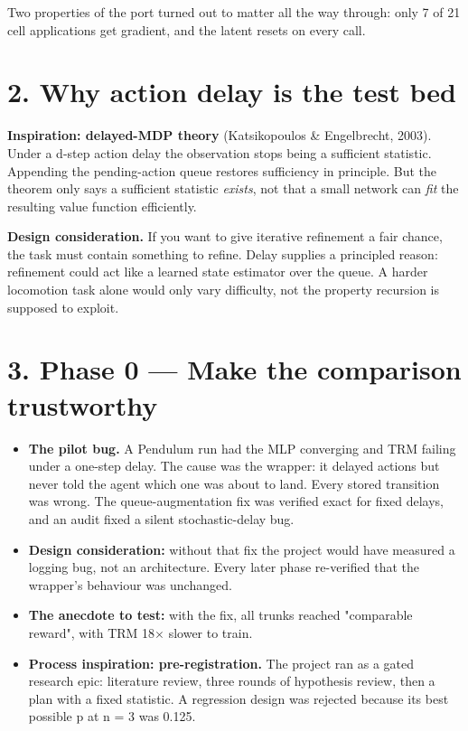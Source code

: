 \documentclass[11pt]{article}
\begin{document}
Two properties of the port turned out to matter all the way through: only 7 of 21 cell applications get gradient, and the latent resets on every call.



\section*{2. Why action delay is the test bed}



\textbf{Inspiration: delayed-MDP theory} (Katsikopoulos \& Engelbrecht, 2003). Under a d-step action delay the observation stops being a sufficient statistic. Appending the pending-action queue restores sufficiency in principle. But the theorem only says a sufficient statistic \emph{exists}, not that a small network can \emph{fit} the resulting value function efficiently.



\textbf{Design consideration.} If you want to give iterative refinement a fair chance, the task must contain something to refine. Delay supplies a principled reason: refinement could act like a learned state estimator over the queue. A harder locomotion task alone would only vary difficulty, not the property recursion is supposed to exploit.



\section*{3. Phase 0 --- Make the comparison trustworthy}



\begin{itemize}
\item \textbf{The pilot bug.} A Pendulum run had the MLP converging and TRM failing under a one-step delay. The cause was the wrapper: it delayed actions but never told the agent which one was about to land. Every stored transition was wrong. The queue-augmentation fix was verified exact for fixed delays, and an audit fixed a silent stochastic-delay bug.
\item \textbf{Design consideration:} without that fix the project would have measured a logging bug, not an architecture. Every later phase re-verified that the wrapper's behaviour was unchanged.
\item \textbf{The anecdote to test:} with the fix, all trunks reached "comparable reward", with TRM 18$\times$ slower to train.
\item \textbf{Process inspiration: pre-registration.} The project ran as a gated research epic: literature review, three rounds of hypothesis review, then a plan with a fixed statistic. A regression design was rejected because its best possible p at n = 3 was 0.125.
\end{itemize}
\end{document}
